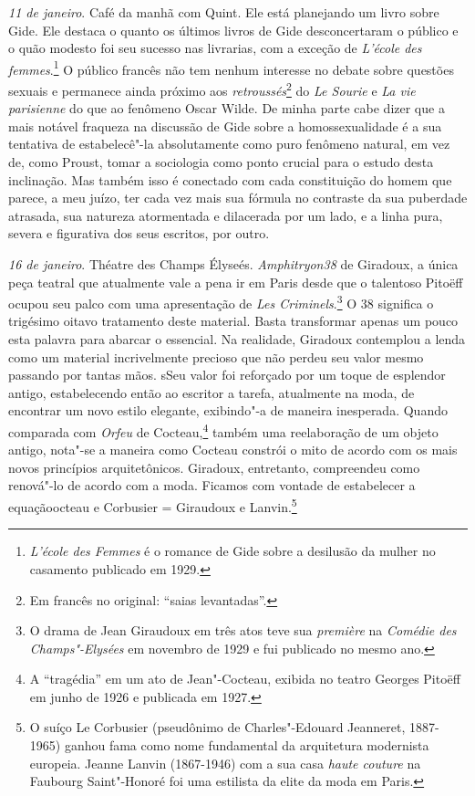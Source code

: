 \emph{11 de janeiro}. Café da manhã com Quint. Ele está planejando um
livro sobre Gide. Ele destaca o quanto os últimos livros de Gide
desconcertaram o público e o quão modesto foi seu sucesso nas livrarias,
com a exceção de \emph{L'école des femmes}.\footnote{\emph{L'école
  des Femmes} é o romance de Gide sobre a desilusão da mulher no
  casamento publicado em 1929. \versal{[N. E.]}} O público francês não tem nenhum
interesse no debate sobre questões sexuais e permanece ainda próximo aos
\emph{retroussés}\footnote{Em francês no original: ``saias levantadas''. \versal{[N. T.]}} do \emph{Le Sourie} e \emph{La vie parisienne} do
que ao fenômeno Oscar Wilde. De minha parte cabe dizer que a mais
notável fraqueza na discussão de Gide sobre a homossexualidade é a sua
tentativa de estabelecê"-la absolutamente como puro fenômeno natural, em
vez de, como Proust, tomar a sociologia como ponto crucial para o estudo
desta inclinação. Mas também isso é conectado com cada constituição do
homem que parece, a meu juízo, ter cada vez mais sua fórmula no
contraste da sua puberdade atrasada, sua natureza atormentada e
dilacerada por um lado, e a linha pura, severa e figurativa dos seus
escritos, por outro.

\emph{16 de janeiro}. Théatre des Champs Élyseés. \emph{Amphitryon38} de
Giradoux, a única peça teatral que atualmente vale a pena ir em Paris
desde que o talentoso Pitoëff ocupou seu palco com uma apresentação de
\emph{Les Criminels}.\footnote{O drama de Jean Giraudoux em três
  atos teve sua \emph{première} na \emph{Comédie des Champs"-Elysées} em
  novembro de 1929 e fui publicado no mesmo ano. \versal{[N. E.]}} O 38 significa o
trigésimo oitavo tratamento deste material. Basta transformar apenas um
pouco esta palavra para abarcar o essencial. Na realidade, Giradoux
contemplou a lenda como um material incrivelmente precioso que não
perdeu seu valor mesmo passando por tantas mãos. sSeu valor foi
reforçado por um toque de esplendor antigo, estabelecendo então ao
escritor a tarefa, atualmente na moda, de encontrar um novo estilo
elegante, exibindo"-a de maneira inesperada. Quando comparada com
\emph{Orfeu} de Cocteau,\footnote{A ``tragédia'' em um ato de
  Jean"-Cocteau, exibida no teatro Georges Pitoëff em junho de 1926 e
  publicada em 1927. \versal{[N. E.]}} também uma reelaboração de um objeto antigo,
nota"-se a maneira como Cocteau constrói o mito de acordo com os mais
novos princípios arquitetônicos. Giradoux, entretanto, compreendeu como
renová"-lo de acordo com a moda. Ficamos com vontade de estabelecer a
equaçãoocteau e Corbusier = Giraudoux e Lanvin.\footnote{O suíço Le
  Corbusier (pseudônimo de Charles"-Edouard Jeanneret, 1887-1965) ganhou
  fama como nome fundamental da arquitetura modernista europeia. Jeanne
  Lanvin (1867-1946) com a sua casa \emph{haute couture} na Faubourg
  Saint"-Honoré foi uma estilista da elite da moda em Paris. \versal{[N. E.]}}

